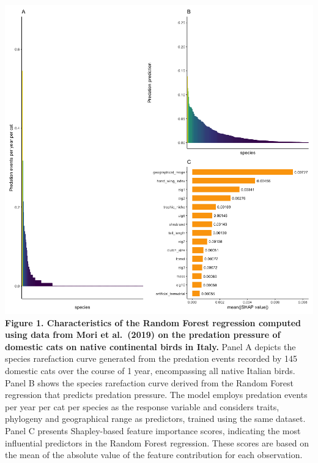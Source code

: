 \documentclass[
  super,
  review,
  3p]{elsarticle}
\begin{document}
\includegraphics{Figure1.png} \textbf{Figure 1. Characteristics of the
Random Forest regression computed using data from Mori et al.~(2019) on
the predation pressure of domestic cats on native continental birds in
Italy.} Panel A depicts the species rarefaction curve generated from the
predation events recorded by 145 domestic cats over the course of 1
year, encompassing all native Italian birds. Panel B shows the species
rarefaction curve derived from the Random Forest regression that
predicts predation pressure. The model employs predation events per year
per cat per species as the response variable and considers traits,
phylogeny and geographical range as predictors, trained using the same
dataset. Panel C presents Shapley-based feature importance scores,
indicating the most influential predictors in the Random Forest
regression. These scores are based on the mean of the absolute value of
the feature contribution for each observation.
\end{document}
